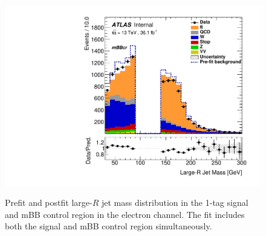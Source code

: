 \begin{figure}[!htbp]
\begin{center}
\includegraphics[scale=0.33]{./figures/boosted/ABCD_1tag0bjet/QCDFloat_1tag_SRmBBcrFit_mBBcr_El_Postfit}\\
\caption{Prefit and postfit large-$R$ jet mass distribution in the 1-tag signal and mBB control region in the electron channel. The fit includes
both the signal and mBB control region simultaneously.}
\label{fig:boostedabcd_mbbcrSRsimul_elec_fit}
\end{center}
\end{figure}

